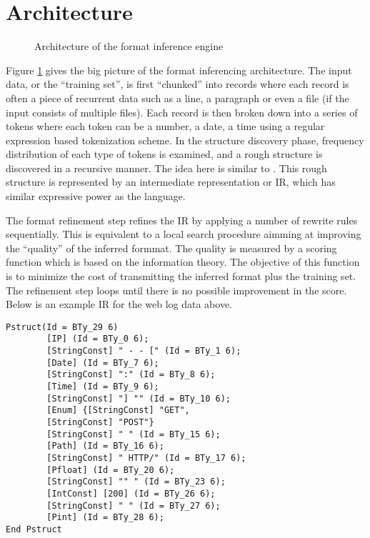 \documentclass{article}
\begin{document}
\section{Architecture}
\begin{figure}
\begin{center}
\caption{Architecture of the format inference engine}
\label{fig-archi}
\end{center}
\end{figure}
Figure \ref{fig-archi} gives the big picture of the format inferencing
architecture. The input data, or the ``training set'', 
is first ``chunked'' into records where
each record is often a piece of recurrent data such as a line, 
a paragraph or even a file (if the input consists of multiple files).
Each record is then broken down into a series of tokens where each
token can be a number, a date, a time using a regular expression
based tokenization scheme. In the structure discovery phase,
frequency distribution of each type of tokens is examined, and
a rough structure is discovered in a recursive manner. The idea here 
is similar to \cite{arasu+:sigmod03}. This
rough structure is represented by an intermediate representation or
IR, which has similar expressive power as the \pads{} language. 

The format refinement step refines the IR by applying a number of
rewrite rules sequentially. This is equivalent to a local search
procedure aimming at improving the ``quality'' of the inferred formmat.
The quality is measured by a scoring function which is based on the
information theory. The objective of this function is to
minimize the cost of transmitting the inferred format plus the
training set. The refinement step loops until there is no possible
improvement in the score. Below is an example IR for the web log
data above.

{\small
\begin{verbatim}
Pstruct(Id = BTy_29 6)
        [IP] (Id = BTy_0 6);
        [StringConst] " - - [" (Id = BTy_1 6);
        [Date] (Id = BTy_7 6);
        [StringConst] ":" (Id = BTy_8 6);
        [Time] (Id = BTy_9 6);
        [StringConst] "] "" (Id = BTy_10 6);
        [Enum] {[StringConst] "GET", 
		[StringConst] "POST"} 
        [StringConst] " " (Id = BTy_15 6);
        [Path] (Id = BTy_16 6);
        [StringConst] " HTTP/" (Id = BTy_17 6);
        [Pfloat] (Id = BTy_20 6);
        [StringConst] "" " (Id = BTy_23 6);
        [IntConst] [200] (Id = BTy_26 6);
        [StringConst] " " (Id = BTy_27 6);
        [Pint] (Id = BTy_28 6);
End Pstruct
\end{verbatim}
}
\end{document}
